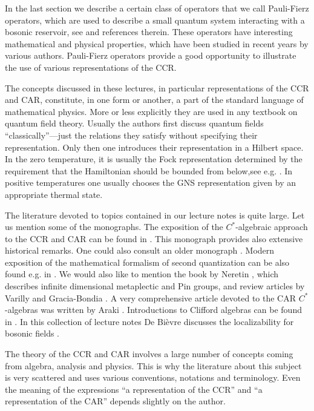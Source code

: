 \documentclass{svmult}
\begin{document}
In the last section we describe a certain class of operators that we call
Pauli-Fierz operators, which are used to describe a small quantum system
interacting with a bosonic reservoir,
 see  \cite{DG,DJ,DJ2,BFS} and references therein.
 These operators have interesting
mathematical and physical properties, which have been studied in recent years
by various authors. Pauli-Fierz operators provide a good opportunity to
illustrate the use of various representations of the CCR.


The concepts discussed in these lectures, in particular 
representations of the 
CCR and CAR,   constitute, in one form or another, a part
of the 
standard language of mathematical physics. More or less explicitly they are
used in any textbook on quantum field theory. Usually the authors  first 
discuss quantum fields ``classically''---just the relations they satisfy
without specifying their representation.
 Only then one introduces their
representation in a Hilbert space. In the zero temperature, it is usually the
Fock representation determined by the requirement that the Hamiltonian  
should be
bounded from below,see e.g. \cite{DB}.
 In positive temperatures one usually  chooses the GNS
representation given by an appropriate thermal state.




The literature devoted to topics contained in our 
lecture notes is quite large. Let
us mention some of the monographs.
The  exposition of the $C^*$-algebraic approach to the 
CCR and CAR can be found in
\cite{BR2}. This monograph provides also extensive historical remarks.
One could also consult  an older monograph \cite{Em}.
Modern exposition of the mathematical formalism of second quantization can be
also found e.g.  in \cite{GJ,BSZ}.
We would also like to mention the book by Neretin \cite{Ne}, which describes infinite
dimensional metaplectic and Pin groups, and review articles by Varilly and
Gracia-Bondia \cite{VGB1,VGB2}. 
A very comprehensive article devoted to the CAR $C^*$-algebras
 was written by Araki \cite{Ar5}. Introductions to Clifford algebras can be
 found in \cite{LM,Tr,Lo}. In this collection of lecture notes
 De Bi\`{e}vre discusses the localizability for bosonic fields \cite{DB}.









The theory of the CCR and CAR involves a large number 
of concepts coming from algebra,
analysis and physics. This is why
 the literature about this subject is 
very scattered and uses various conventions, notations
and  terminology.
 Even the meaning of the expressions ``a representation of
the CCR'' and ``a representation of the CAR'' depends
slightly on the author.
\end{document}
